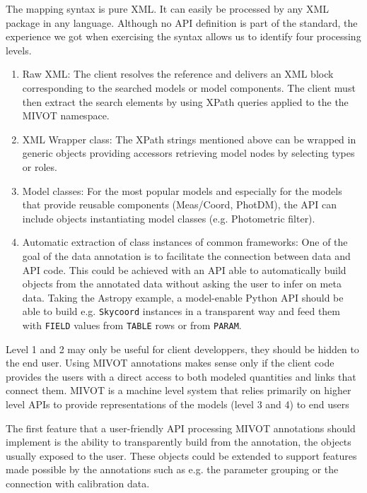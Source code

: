 The mapping syntax is pure XML. It can easily be processed by any XML package in any language.
Although no API definition is part of the standard, the experience we got when exercising the syntax allows us to identify 
four processing levels.

\begin{enumerate} 
  \item Raw XML: The client resolves the reference and delivers an XML block corresponding to the searched models or model components. 
        The client must then extract the search elements by using XPath queries applied to the the MIVOT namespace.
  \item XML Wrapper class: The XPath strings mentioned above can be wrapped in generic objects providing 
        accessors retrieving model nodes by selecting types or roles. 
  \item Model classes: For the most popular models and especially for the models that provide reusable 
        components (Meas/Coord, PhotDM), the API can include objects instantiating model classes (e.g. Photometric filter).
  \item Automatic extraction of class instances of common frameworks: One of the goal of the data annotation is to 
        facilitate the connection between data and API code. This could be achieved with an API able to automatically 
        build objects from the annotated data without asking the user to infer on meta data. Taking the Astropy example, 
        a model-enable Python API should be able to build e.g. \texttt{Skycoord} instances in a transparent way and 
        feed them with \texttt{FIELD} values from \texttt{TABLE} rows or from \texttt{PARAM}.
 \end{enumerate}

Level 1 and 2 may only be useful for client developpers, they should be hidden to the end user. 
Using MIVOT annotations makes sense only if the client code provides 
the users with a direct access to both modeled quantities and links that connect them. 
MIVOT is a machine level system that relies primarily on higher level APIs to provide representations 
of the models (level 3 and 4) to end users

The first feature that a user-friendly API processing MIVOT annotations should implement is the ability 
to transparently build from the annotation, the objects usually exposed to the user. 
These objects could be extended to support features made 
possible by the annotations such as e.g. the parameter grouping or the connection with calibration data.
